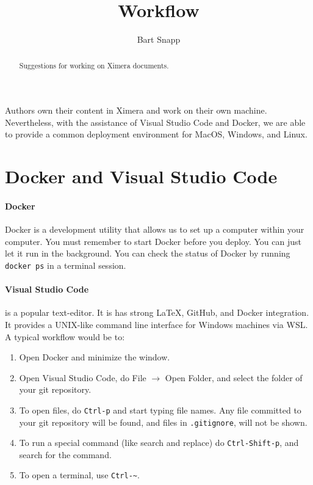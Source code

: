 \documentclass{ximera}
\title{Workflow}
\author{Bart Snapp}
\begin{document}
\begin{abstract}
    Suggestions for working on Ximera documents.
\end{abstract}
\maketitle

Authors own their content in Ximera and work on their own machine.
Nevertheless, with the assistance of Visual Studio Code and Docker, we are able
to provide a common deployment environment for MacOS, Windows, and Linux.


\section{Docker and Visual Studio Code}

\paragraph{Docker}

Docker is a development utility that allows us to set up a computer within your
computer. You must remember to start Docker before you deploy. You can just let
it run in the background. You can check the status of Docker by running
\verb!docker ps! in a terminal session.

\paragraph{Visual Studio Code}
is a popular text-editor. It is has strong \LaTeX, GitHub,
and Docker integration. It provides a UNIX-like command line interface for
Windows machines via WSL. A typical workflow would be to:
\begin{enumerate}
    \item Open Docker and minimize the window.
    \item Open Visual Studio Code, do File $\to$ Open Folder, and select the
          folder of your git repository.
    \item To open files, do \verb!Ctrl-p! and start typing file names. Any file
          committed to your git repository will be found, and files in
          \verb!.gitignore!, will not be shown.
    \item To run a special command (like search and replace) do
          \verb!Ctrl-Shift-p!, and search for the command.
    \item To open a terminal, use \verb!Ctrl-~!.
\end{enumerate}
\end{document}
